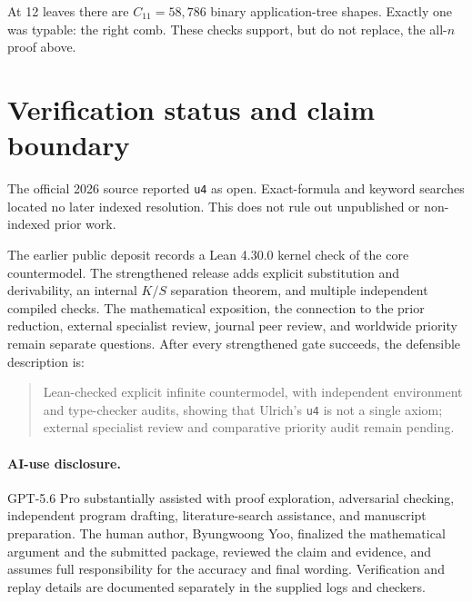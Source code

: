 \documentclass[11pt]{article}
\begin{document}
At 12 leaves there are $C_{11}=58{,}786$ binary application-tree shapes.
Exactly one was typable: the right comb.  These checks support, but do not
replace, the all-$n$ proof above.

\section{Verification status and claim boundary}

The official 2026 source reported \texttt{u4} as open.  Exact-formula and
keyword searches located no later indexed resolution.  This does not rule out
unpublished or non-indexed prior work.

The earlier public deposit records a Lean 4.30.0 kernel check of the core
countermodel.  The strengthened release adds explicit substitution and
derivability, an internal $K/S$ separation theorem, and multiple independent
compiled checks.  The mathematical exposition, the connection to the prior
reduction, external specialist review, journal peer review, and worldwide
priority remain separate questions.  After every strengthened gate succeeds,
the defensible description is:

\begin{quote}
Lean-checked explicit infinite countermodel, with independent environment and
type-checker audits, showing that Ulrich's \texttt{u4} is not a single axiom;
external specialist review and comparative priority audit remain pending.
\end{quote}

\paragraph{AI-use disclosure.}
GPT-5.6 Pro substantially assisted with proof exploration, adversarial
checking, independent program drafting, literature-search assistance, and
manuscript preparation.  The human author, Byungwoong Yoo, finalized the
mathematical argument and the submitted package, reviewed the claim and
evidence, and assumes full responsibility for the accuracy and final wording.
Verification and replay details are documented separately in the supplied logs
and checkers.
\end{document}
